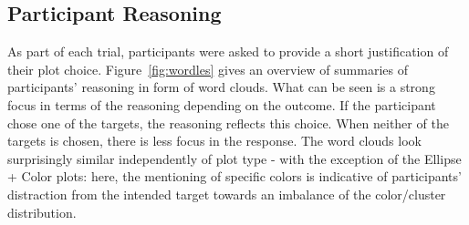 \documentclass[11pt]{isuthesis}\usepackage[]{graphicx}\usepackage[]{color}
\begin{document}
\subsection{Participant Reasoning}\label{sec:sentiment}
As part of each trial, participants were asked to provide a short justification of their plot choice. Figure~\ref{fig:wordles} gives an overview of summaries of participants' reasoning in form of word clouds. What can be seen is a strong focus in terms of the reasoning depending on the outcome. If the participant chose one of the targets, the reasoning reflects this choice. When neither of the targets is chosen, there is less focus in the response. The word clouds look surprisingly similar independently of plot type - with the exception of the Ellipse + Color plots: here, the mentioning of specific colors is indicative of participants' distraction from the intended target towards an imbalance of the color/cluster distribution. 
\end{document}
